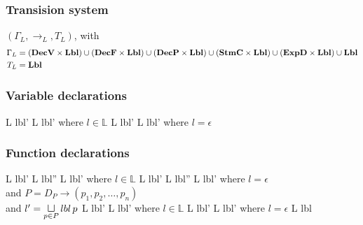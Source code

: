 \subsubsection{Transision system}
$(\Gamma_{L}, \rightarrow_{L}, T_{L})$, with
\begin{align*}
  \Gamma_{L} & = (\mathbf{DecV} \times \mathbf{Lbl}) \cup (\mathbf{DecF} \times \mathbf{Lbl}) \cup (\mathbf{DecP} \times \mathbf{Lbl}) \cup (\mathbf{StmC} \times \mathbf{Lbl}) \cup (\mathbf{ExpD} \times \mathbf{Lbl}) \cup \mathbf{Lbl} \\
  T_{L} & = \mathbf{Lbl}
\end{align*}

\subsubsection{Variable declarations}

\begin{trules}
        { {L} {lbl'} }
        { {L} {lbl'} }
        {where $l \in \mathbb{L}$}
        { {L} {lbl'} }
        { {L} {lbl'} }
        {where $l = \epsilon$}
\end{trules}

\subsubsection{Function declarations}

\begin{trules}
        { {L} {lbl'} }
        { {L} {lbl''} \;\;  {L} {lbl'} }
        {where $l \in \mathbb{L}$}
        { {L} {lbl'} }
        { {L} {lbl''} \;  {L} {lbl'} }
        {where $l = \epsilon$\\
        and $P = D_P \rightarrow (p_1, p_2, \dots, p_n)$\\
        and $l' = \sqcupl\limits_{p \in P} lbl \, p$}
        { {L} {lbl'} }
        { {L} {lbl'} }
        {where $l \in \mathbb{L}$}
        { {L} {lbl'} }
        { {L} {lbl'} }
        {where $l = \epsilon$}
        { {L} {lbl} }
        {}
        {}
\end{trules}

